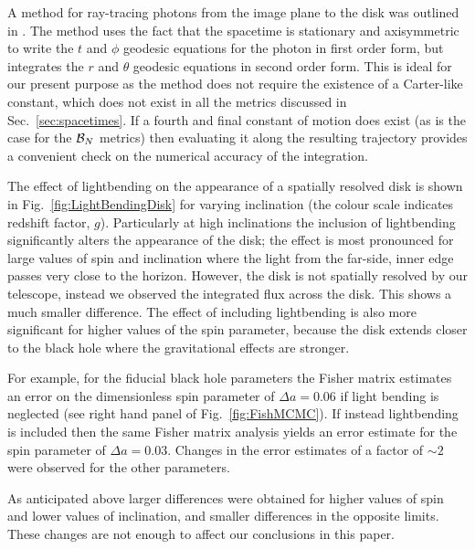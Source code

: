 A method for ray-tracing photons from the image plane to the disk was outlined in \cite{2012ApJ...745....1P}. The method uses the fact that the spacetime is stationary and axisymmetric to write the $t$ and $\phi$ geodesic equations for the photon in first order form, but integrates the $r$ and $\theta$ geodesic equations in second order form. This is ideal for our present purpose as the method does not require the existence of a Carter-like constant, which does not exist in all the metrics discussed in Sec.\ \ref{sec:spacetimes}. If a fourth and final constant of motion does exist (as is the case for the ${\cal{B}}_{N}$ metrics) then evaluating it along the resulting trajectory provides a convenient check on the numerical accuracy of the integration. 

The effect of lightbending on the appearance of a spatially resolved disk is shown in Fig.\ \ref{fig:LightBendingDisk} for varying inclination (the colour scale indicates redshift factor, $g$).  Particularly at high inclinations the inclusion of lightbending significantly alters the appearance of the disk; the effect is most pronounced for large values of spin and inclination where the light from the far-side, inner edge passes very close to the horizon. However, the disk is not spatially resolved by our telescope, instead we observed the integrated flux across the disk. This shows a much smaller difference. The effect of including lightbending is also more significant for higher values of the spin parameter, because the disk extends closer to the black hole where the gravitational effects are stronger. 


For example, for the fiducial black hole parameters the Fisher matrix estimates an error on the dimensionless spin parameter of $\Delta a=0.06$ if light bending is neglected (see right hand panel of Fig.\ \ref{fig:FishMCMC}). If instead lightbending is included then the same Fisher matrix analysis yields an error estimate for the spin parameter of $\Delta a=0.03$. Changes in the error estimates of a factor of $\sim 2$ were observed for the other parameters. 

As anticipated above larger differences were obtained for higher values of spin and lower values of inclination, and smaller differences in the opposite limits. These changes are not enough to affect our conclusions in this paper.

